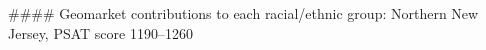 #### Geomarket contributions to each racial/ethnic group: Northern New Jersey, PSAT score 1190–1260
